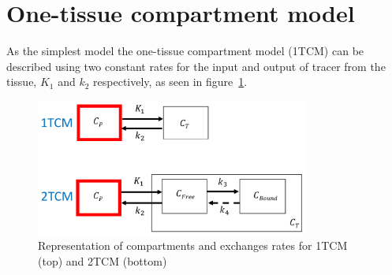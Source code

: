 \section{One-tissue compartment model}
As the simplest model the one-tissue compartment model (1TCM) can be described using two constant rates for the input and output of tracer from the tissue, $K_1$ and $k_2$ respectively, as seen in figure~\ref{fig:1_2TCM}.

\begin{figure}[ht!]
	\includegraphics[width=0.8\textwidth]{2_Theory_Methods/figures/TissueCompartmentModels.pdf}
	\centering
	\caption{Representation of compartments and exchanges rates for 1TCM (top) and 2TCM (bottom)}
	\centering
	\label{fig:1_2TCM}
\end{figure}


